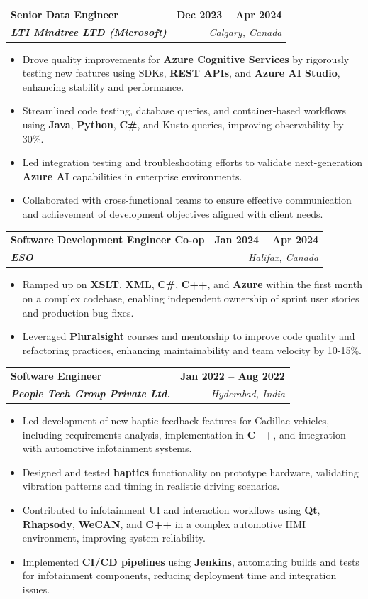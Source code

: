 \documentclass[letterpaper,11pt]{article}
\makeatletter
\newcommand{\resumeItem}[1]{
  \item\small{
    {#1 \vspace{-2pt}}
  }
}
\newcommand{\resumeSubheading}[4]{
  \vspace{-2pt}\item
    \begin{tabular*}{1.0\textwidth}[t]{l@{\extracolsep{\fill}}r}
      \textbf{#1} & \textbf{\small #2} \\
      \textit{\small#3} & \textit{\small #4} \\
    \end{tabular*}\vspace{-7pt}
}
\newcommand{\resumeItemListStart}{\begin{itemize}}
\newcommand{\resumeItemListEnd}{\end{itemize}\vspace{-5pt}}
\makeatother
\begin{document}
    \resumeSubheading
      {\textbf{Senior Data Engineer}}{\textbf{Dec 2023 -- Apr 2024}}
      {\textbf{LTI Mindtree LTD (Microsoft)}}{Calgary, Canada}
      \resumeItemListStart
        \resumeItem{Drove quality improvements for \textbf{Azure Cognitive Services} by rigorously testing new features using SDKs, \textbf{REST APIs}, and \textbf{Azure AI Studio}, enhancing stability and performance.}
        \resumeItem{Streamlined code testing, database queries, and container-based workflows using \textbf{Java}, \textbf{Python}, \textbf{C\#}, and Kusto queries, improving observability by 30\%.}
        \resumeItem{Led integration testing and troubleshooting efforts to validate next-generation \textbf{Azure AI} capabilities in enterprise environments.}
        \resumeItem{Collaborated with cross-functional teams to ensure effective communication and achievement of development objectives aligned with client needs.}
      \resumeItemListEnd
    
    \resumeSubheading
      {\textbf{Software Development Engineer Co-op}}{\textbf{Jan 2024 -- Apr 2024}}
      {\textbf{ESO}}{Halifax, Canada}
      \resumeItemListStart
        \resumeItem{Ramped up on \textbf{XSLT}, \textbf{XML}, \textbf{C\#}, \textbf{C++}, and \textbf{Azure} within the first month on a complex codebase, enabling independent ownership of sprint user stories and production bug fixes.}
        \resumeItem{Leveraged \textbf{Pluralsight} courses and mentorship to improve code quality and refactoring practices, enhancing maintainability and team velocity by 10-15\%.}
      \resumeItemListEnd

    \resumeSubheading
      {\textbf{Software Engineer}}{\textbf{Jan 2022 -- Aug 2022}}
      {\textbf{People Tech Group Private Ltd.}}{Hyderabad, India}
      \resumeItemListStart
        \resumeItem{Led development of new haptic feedback features for Cadillac vehicles, including requirements analysis, implementation in \textbf{C++}, and integration with automotive infotainment systems.}
        \resumeItem{Designed and tested \textbf{haptics} functionality on prototype hardware, validating vibration patterns and timing in realistic driving scenarios.}
        \resumeItem{Contributed to infotainment UI and interaction workflows using \textbf{Qt}, \textbf{Rhapsody}, \textbf{WeCAN}, and \textbf{C++} in a complex automotive HMI environment, improving system reliability.}
        \resumeItem{Implemented \textbf{CI/CD pipelines} using \textbf{Jenkins}, automating builds and tests for infotainment components, reducing deployment time and integration issues.}
      \resumeItemListEnd
\end{document}
